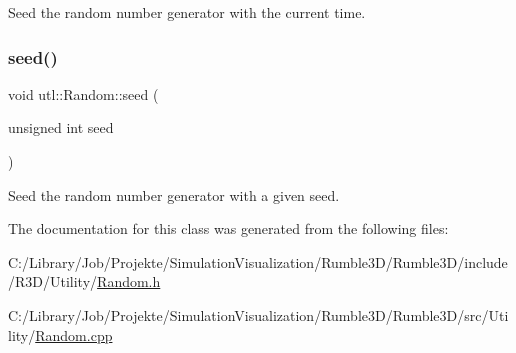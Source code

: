 Seed the random number generator with the current time. \mbox{\label{classutl_1_1_random_ac91fc644c7437c700f2c1addeb65125a}} 
\subsubsection{\texorpdfstring{seed()}{seed()}\hspace{0.1cm}{\footnotesize\ttfamily [2/2]}}
{\footnotesize\ttfamily void utl\+::\+Random\+::seed (\begin{DoxyParamCaption}\item[{unsigned int}]{seed }\end{DoxyParamCaption})\hspace{0.3cm}{\ttfamily [static]}}

Seed the random number generator with a given seed. 

The documentation for this class was generated from the following files\+:\begin{DoxyCompactItemize}
\item 
C\+:/\+Library/\+Job/\+Projekte/\+Simulation\+Visualization/\+Rumble3\+D/\+Rumble3\+D/include/\+R3\+D/\+Utility/\mbox{\hyperlink{_random_8h}{Random.\+h}}\item 
C\+:/\+Library/\+Job/\+Projekte/\+Simulation\+Visualization/\+Rumble3\+D/\+Rumble3\+D/src/\+Utility/\mbox{\hyperlink{_random_8cpp}{Random.\+cpp}}\end{DoxyCompactItemize}
